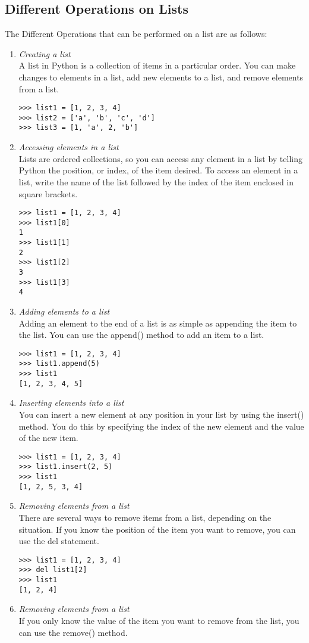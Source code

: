 \documentclass[11pt]{article}
\begin{document}
\subsection{Different Operations on Lists}

The Different Operations that can be performed on a list are as follows:
\begin{enumerate}
	\item \textit{Creating a list}\\
	      A list in Python is a collection of items in a particular order. You can make changes to elements in a list, add new elements to a list, and remove elements from a list.
	      \begin{lstlisting}
>>> list1 = [1, 2, 3, 4]
>>> list2 = ['a', 'b', 'c', 'd']
>>> list3 = [1, 'a', 2, 'b']
\end{lstlisting}
	\item \textit{Accessing elements in a list}\\
	      Lists are ordered collections, so you can access any element in a list by telling Python the position, or index, of the item desired. To access an element in a list, write the name of the list followed by the index of the item enclosed in square brackets.
	      \begin{lstlisting}
>>> list1 = [1, 2, 3, 4]
>>> list1[0]
1
>>> list1[1]
2
>>> list1[2]
3
>>> list1[3]
4
\end{lstlisting}
	\item \textit{Adding elements to a list}\\
	      Adding an element to the end of a list is as simple as appending the item to the list. You can use the append() method to add an item to a list.
	      \begin{lstlisting}
>>> list1 = [1, 2, 3, 4]
>>> list1.append(5)
>>> list1
[1, 2, 3, 4, 5]
\end{lstlisting}
	\item \textit{Inserting elements into a list}\\
	      You can insert a new element at any position in your list by using the insert() method. You do this by specifying the index of the new element and the value of the new item.
	      \begin{lstlisting}
>>> list1 = [1, 2, 3, 4]
>>> list1.insert(2, 5)
>>> list1
[1, 2, 5, 3, 4]
\end{lstlisting}
	\item \textit{Removing elements from a list}\\
	      There are several ways to remove items from a list, depending on the situation. If you know the position of the item you want to remove, you can use the del statement.
	      \begin{lstlisting}
>>> list1 = [1, 2, 3, 4]
>>> del list1[2]
>>> list1
[1, 2, 4]
\end{lstlisting}
	\item \textit{Removing elements from a list}\\
	      If you only know the value of the item you want to remove from the list, you can use the remove() method.


\end{enumerate}
\end{document}
